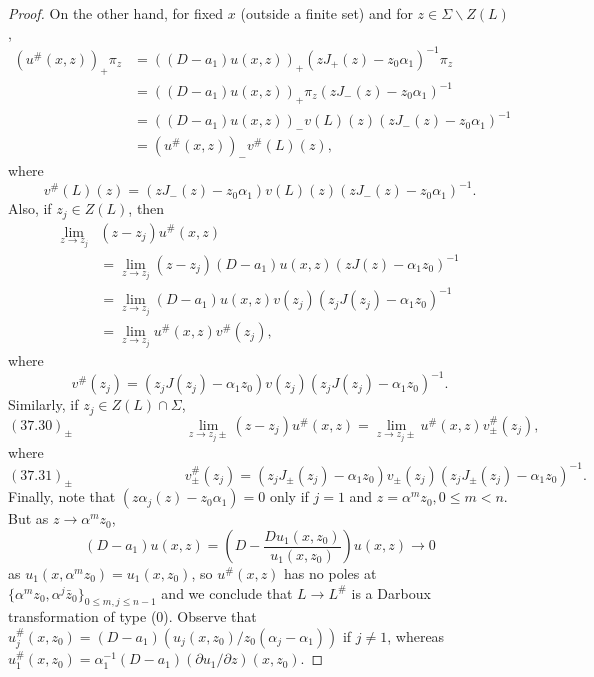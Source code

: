 \documentclass{surv-l}
\theoremstyle{plain}
\theoremstyle{definition}
\numberwithin{equation}{chapter}
\begin{document}
\begin{proof}
On the other hand, for fixed $x$ (outside a finite set) and for $z\in\Sigma\backslash Z(L)$,
\begin{align}\label{eq37.26}
(u^{\#}(x, z))_{+}\pi_{z}&=((D-a_{1})u(x, z))_{+}(zJ_{+}(z)-z_{0}\alpha_{1})^{-1}\pi_{z}\\
&=((D-a_{1})u(x, z))_{+}\pi_{z}(zJ_{-}(z)-z_{0}\alpha_{1})^{-1}\nonumber\\
&=((D-a_{1})u(x, z))_{-}v(L)(z)(zJ_{-}(z)-z_{0}\alpha_{1})^{-1}\nonumber\\
&=(u^{\#}(x, z))_{-}v^{\#}(L)(z),\nonumber
\end{align}
where
\begin{equation}\label{eq37.27}
v^{\#}(L)(z)=(zJ_{-}(z)-z_{0}\alpha_{1})v(L)(z)(zJ_{-}(z)-z_{0}\alpha_{1})^{-1}.
\end{equation}
Also, if $z_{j}\in Z(L)$, then
\begin{align}\label{eq37.28}
\lim_{z\rightarrow z_{j}}&(z-z_{j})u^{\#}(x,z)\\
&=\lim_{z\rightarrow z_{j}}(z-z_{j})(D-a_{1})u(x, z)(zJ(z)-\alpha_{1}z_{0})^{-1}\nonumber\\
&=\lim_{z\rightarrow z_{j}}(D-a_{1})u(x, z)v(z_{j})(z_{j}J(z_{j})-\alpha_{1}z_{0})^{-1}\nonumber\\
&=\lim_{z\rightarrow z_{j}}u^{\#}(x, z)v^{\#}(z_{j}),\nonumber
\end{align}
where
\begin{equation}\label{eq37.29}
v^{\#}(z_{j})=(z_{j}J(z_{j})-\alpha_{1}z_{0})v(z_{j})(z_{j}J(z_{j})-\alpha_{1}z_{0})^{-1}.
\end{equation}
Similarly, if $z_{j}\in Z(L)\cap\Sigma$,
\begin{equation*}
(37.30)_{\pm}\qquad\qquad\qquad\qquad\lim_{z\rightarrow z_{j}\pm}(z-z_{j})u^{\#}(x, z)=\lim_{z\rightarrow z_{j}\pm}u^{\#}(x, z)v_{\pm}^{\#}(z_{j}),
\end{equation*}
where
\begin{equation*}
(37.31)_{\pm}\qquad\qquad\qquad\qquad v_{\pm}^{\#}(z_{j})=(z_{j}J_{\pm}(z_{j})-\alpha_{1}z_{0})v_{\pm}(z_{j})(z_{j}J_{\pm}(z_{j})-\alpha_{1}z_{0})^{-1}.
\end{equation*}
Finally, note that $(z\alpha_{j}(z) -z_{0}\alpha_{1})=0$ only if $j=1$ and $z=\alpha^{m}z_{0},0\leq m<n$. But as $z \rightarrow\alpha^{m}z_{0}$,
\begin{equation*}
(D-a_{1})u(x,z)=\left(D-\frac{Du_{1}(x,z_{0})}{u_{1}(x,z_{0})}\right)u(x, z)\rightarrow 0
\end{equation*}
as $u_{1}(x, \alpha^{m}z_{0})=u_{1}(x, z_{0})$, so $ u^{\#} (x,z)$ has no poles at $\{\alpha^{m}z_{0}, \alpha^{j}\bar{z}_{0}\}_{0\leq m,j\leq n-1}$ and we conclude that $L\rightarrow L^{\#}$ is a Darboux transformation of type (0). Observe that $u_{j}^{\#}(x, z_{0})=(D-a_{1})(u_{j}(x, z_{0})/z_{0}(\alpha_{j}-\alpha_{1}))$ if $j\neq 1$, whereas $u_{1}^{\#}(x, z_{0})= \alpha_{1}^{-1}(D-a_{1})(\partial u_{1}/\partial z)(x,z_{0})$.


\end{proof}
\end{document}
